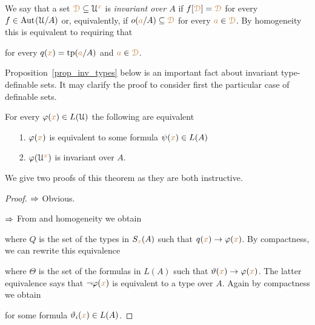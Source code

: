 We say that a set ${\color{brown}\EuScript D}\subseteq\EuScript U^{{\color{brown} x}}$ is \emph{invariant over $A$\/} if $f[{\color{brown}\EuScript D}]={\color{brown}\EuScript D}$ for every $f\in{\rm Aut\kern.15ex}(\EuScript U/A)$ or, equivalently, if $o({\color{brown} a}/A)\subseteq {\color{brown}\EuScript D}$ for every ${\color{brown} a}\in {\color{brown}\EuScript D}$.
By homogeneity this is equivalent to requiring that 


for every $q({\color{brown} x})={\rm tp}({\color{brown} a}/A)$ and ${\color{brown} a}\in {\color{brown}\EuScript D}$.

Proposition~\ref{prop_inv_types} below is an important fact about invariant type-definable sets.
It may clarify the proof to consider first the particular case of definable sets.

\begin{proposition}\label{prop_inv_def}
For every $\varphi({\color{brown} x})\in L(\EuScript U)$ the following are equivalent
\begin{itemize}
 \item[1.] $\varphi({\color{brown} x})$ is equivalent to some formula $\psi({\color{brown} x})\in L(A)$
 \item[2.] $\varphi(\EuScript U^{\color{brown} x})$ is invariant over $A$.
\end{itemize}
\end{proposition}

We give two proofs of this theorem as they are both instructive.

\vspace*{-\parskip}
\begin{proof}
$\Rightarrow$ Obvious.

$\Rightarrow$ From  and homogeneity we obtain


where $Q$ is the set of the types in $S_{\color{brown} x}(A)$ such that $q({\color{brown} x})\rightarrow\varphi({\color{brown} x})$. 
By compactness, we can rewrite this equivalence 


where $\Theta$ is the set of the formulas in $L(A)$ such that $\vartheta({\color{brown} x})\rightarrow\varphi({\color{brown} x})$.
The latter equivalence says that $\neg\varphi({\color{brown} x})$ is equivalent to a type over $A$. 
Again by compactness we obtain 


for some formula $\vartheta_i({\color{brown} x})\in L(A)$.
\end{proof}

